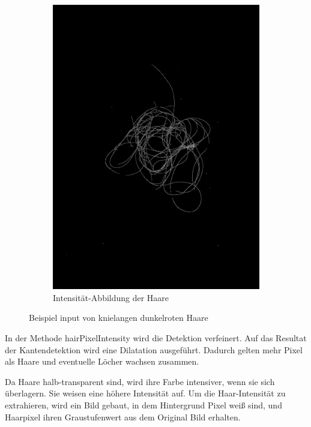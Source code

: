 \documentclass[german,a4paper, 12pt]{llncs}
\begin{document}
\begin{figure}
\begin{subfigure}[b]{0.475\textwidth}
		\includegraphics[width=\textwidth]{fig64/05intenstiy.png}
		\caption[]{Intensität-Abbildung der Haare}
		\label{img:Intensity}
	\end{subfigure}
	\caption[  ]
	{\small Beispiel input von knielangen dunkelroten Haare} 
	\label{img:cannywrap}
\end{figure}


In der Methode hairPixelIntensity wird die Detektion verfeinert.
Auf das Resultat der Kantendetektion wird eine Dilatation ausgeführt. Dadurch gelten mehr Pixel als Haare und eventuelle Löcher wachsen zusammen.\cite{DilationCV}

Da Haare halb-transparent sind, wird ihre Farbe intensiver, wenn sie sich überlagern. Sie weisen eine höhere Intensität auf.
Um die Haar-Intensität zu extrahieren, wird ein Bild gebaut, in dem Hintergrund Pixel weiß sind, und Haarpixel ihren Graustufenwert aus dem Original Bild erhalten.
\end{document}
